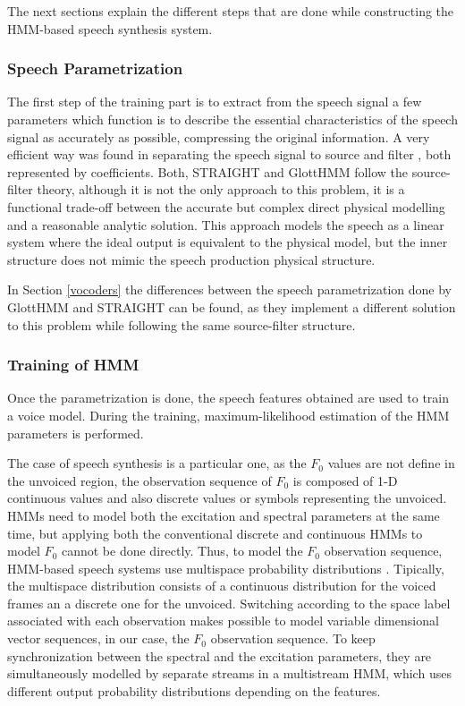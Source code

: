 The next sections explain the different steps that are done while constructing the HMM-based speech synthesis system.

\subsubsection{Speech Parametrization}
\label{hmm_synthesis_parametrization}
The first step of the training part is to extract from the speech signal a few parameters which function is to describe the essential characteristics of the speech signal as accurately as possible, compressing the original information.
%
A very efficient way was found in separating the speech signal to source and filter \cite{Fant1970}, both represented by coefficients. 
%
Both, STRAIGHT and GlottHMM follow the source-filter theory, although it is not the only approach to this problem, it is a functional trade-off between the accurate but complex direct physical modelling and a reasonable analytic solution.
%
This approach models the speech as a linear system where the ideal output is equivalent to the physical model, but the inner structure does not mimic the speech production physical structure.

In Section \ref{vocoders} the differences between the speech parametrization done by GlottHMM and STRAIGHT can be found, as they implement a different solution to this problem while following the same source-filter structure.

\subsubsection{Training of HMM}
\label{hmm_synthesis_training}
Once the parametrization is done, the speech features obtained are used to train a voice model. 
%
During the training, maximum-likelihood estimation of the HMM parameters is performed.

The case of speech synthesis is a particular one, as the $F_{0}$ values are not define in the unvoiced region, the observation sequence of $F_{0}$ is composed of 1-D continuous values and also discrete values or symbols representing the unvoiced.
%
HMMs need to model both the excitation and spectral parameters at the same time, but applying both the conventional discrete and continuous HMMs to model $F_{0}$ cannot be done directly. 
%
Thus, to model the $F_{0}$ observation sequence, HMM-based speech systems use multispace probability distributions \cite{tokuda2002multi}. 
%
Tipically, the multispace distribution consists of a continuous distribution for the voiced frames an a discrete one for the unvoiced. 
%
Switching according to the space label associated with each observation makes possible to model variable dimensional vector sequences, in our case, the $F_{0}$ observation sequence.
% 
To keep synchronization between the spectral and the excitation parameters, they are simultaneously modelled by separate streams in a multistream HMM, which uses different output probability distributions depending on the features.

